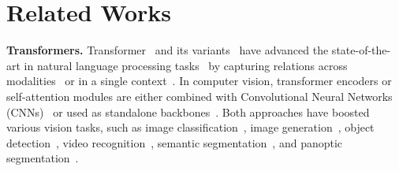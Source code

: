 \documentclass[runningheads]{llncs}
\begin{document}
\label{sec:intro} \section{Related Works}
\label{sec:related}

\textbf{Transformers.}\quad
Transformer~\cite{vaswani2017attention} and its variants~\cite{kitaev2020reformer,wang2020linformer,luong2015effective,child2019generating,beltagy2020longformer,zaheer2020big,gupta2020gmat,ainslie2020etc} have advanced the state-of-the-art in natural language processing tasks~\cite{devlin2019bert,shaw2018self,dai2019transformer} by capturing relations across modalities~\cite{bahdanau2014neural} or in a single context~\cite{cheng2016long,vaswani2017attention}. In computer vision, transformer encoders or self-attention modules are either combined with Convolutional Neural Networks (CNNs)~\cite{wang2018non,buades2005non} or used as standalone backbones~\cite{parmar2019stand,hu2019local,wang2020axial,dosovitskiy2020image,liu2021swin}. Both approaches have boosted various vision tasks, such as image classification~\cite{chen20182,bello2019attention,parmar2019stand,hu2019local,li2020neural,wang2020axial,dosovitskiy2020image,liu2021swin,yu2021glance,yang2022lite}, image generation~\cite{parmar2018image,ho2019axial}, object detection~\cite{wang2018non,shen2021efficient,parmar2019stand,hu2018relation,carion2020end,zhu2020deformable}, video recognition~\cite{wang2018non,chen20182,arnab2021vivit,fan2021multiscale}, semantic segmentation~\cite{chen2016attention,zhao2018psanet,huang2019ccnet,fu2019dual,zhu2019asymmetric,zhu2019empirical,zheng2021rethinking,xie2021segformer,chen2021transunet}, and panoptic segmentation~\cite{wang2020axial}.
\end{document}
